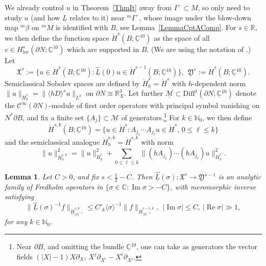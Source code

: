 \documentclass[reqno,11pt,letterpaper]{amsart}
\numberwithin{equation}{section}
\numberwithin{figure}{section}
\newtheorem{lemma}[thm]{Lemma}
\theoremstyle{definition}
\theoremstyle{remark}
\newcommand{\mc}{\mathcal}
\newcommand{\cC}{\mc C}
\newcommand{\cM}{\mc M}
\newcommand{\C}{\mathbb{C}}
\newcommand{\N}{\mathbb{N}}
\newcommand{\R}{\mathbb{R}}
\newcommand{\fX}{\mathfrak{X}}
\newcommand{\fY}{\mathfrak{Y}}
\renewcommand{\Re}{\operatorname{Re}}
\renewcommand{\Im}{\operatorname{Im}}
\newcommand{\la}{\langle}
\newcommand{\pa}{\partial}
\newcommand{\ra}{\rangle}
\newcommand{\ul}[1]{\underline{#1}{}}
\newcommand{\wh}{\widehat}
\newcommand{\Diff}{\mathrm{Diff}}
\newcommand{\half}{\tfrac{1}{2}}
\newcommand{\loc}{{\mathrm{loc}}}
\newcommand{\CI}{\cC^\infty}
\newcommand{\Hloc}{H_{\loc}}
\newcommand{\Hsupp}{\dot H}
\begin{document}
We already control $u$ in Theorem~\ref{ThmIt} away from $I^+\subset M$, so only need to study $u$ (and how $\ul L$ relates to it) near ${}^m I^+$, whose image under the blow-down map ${}^m\beta$ on ${}^mM$ is identified with $B$, see Lemma~\ref{LemmaCptAComp}. For $s\in\R$, we then define the function space $\Hsupp^s(B;\ul\C^{10})$ as the space of all $v\in\Hloc^s(\pa N;\ul\C^{10})$ which are supported in $B$. (We are using the notation of \cite[Appendix~B]{HormanderAnalysisPDE3}.) Let
\[
  \fX^s := \{ u\in\Hsupp^s(B;\ul\C^{10}) \colon \wh{\ul L}(0)u \in \Hsupp^{s-1}(B;\ul\C^{10})\},\ \ 
  \fY^s := \Hsupp^s(B;\ul\C^{10}).
\]
Semiclassical Sobolev spaces are defined by $\Hsupp_h^s=\Hsupp^s$ with $h$-dependent norm $\|u\|_{\Hsupp_h^s}=\|\la h D\ra^s u\|_{L^2}$ on $\pa N\cong\R_X^3$. Let further $\ul\cM\subset\Diff^1(\pa N;\ul\C^{10})$ denote the $\CI(\pa N)$-module of first order operators with principal symbol vanishing on $N^*\pa B$, and fix a finite set $\{A_j\}\subset\ul\cM$ of generators.\footnote{Near $\pa B$, and omitting the bundle $\ul\C^{10}$, one can take as generators the vector fields $(|X|-1)X\pa_X$, $X^j\pa_{X^i}-X^i\pa_{X^j}$.} For $k\in\N_0$, we then define
\[
  \Hsupp^{s,k}(B;\ul\C^{10}) = \{ u\in\Hsupp^s \colon A_{j_1}\cdots A_{j_\ell}u\in\Hsupp^s,\,0\leq\ell\leq k \}
\]
and the semiclassical analogue $\Hsupp_h^{s,k}=\Hsupp^{s,k}$ with norm
\[
  \|u\|_{\Hsupp_h^{s,k}}^2 = \|u\|_{\Hsupp_h^s}^2 + \sum_{0\leq\ell\leq k} \|(h A_{j_1})\cdots(h A_{j_\ell})u\|_{\Hsupp_h^s}^2.
\]
\begin{lemma}
\label{LemmaItipFred}
  Let $C>0$, and fix $s<\half-C$. Then $\wh{\ul L}(\sigma)\colon\fX^s\to\fY^{s-1}$ is an analytic family of Fredholm operators in $\{\sigma\in\C\colon\Im\sigma>-C\}$, with meromorphic inverse satisfying
  \[
    \| \wh{\ul L}(\sigma)^{-1}f\|_{\Hsupp_{\la\sigma\ra^{-1}}^{s,k}} \leq C'_k\la\sigma\ra^{-1}\|f\|_{\Hsupp_{\la\sigma\ra^{-1}}^{s-1,k}},\ \ 
    |\Im\sigma|\leq C,\ |\Re\sigma| \gg 1,
  \]
  for any $k\in\N_0$.
\end{lemma}
\end{document}
